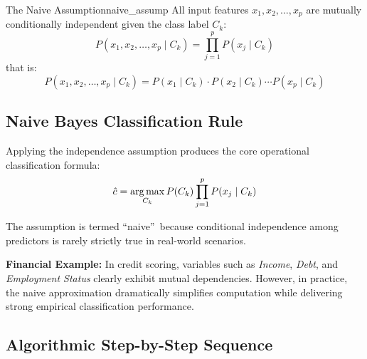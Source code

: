 \begin{definition}{The Naive Assumption}{naive_assump}
All input features $x_1, x_2, \dots, x_p$ are mutually conditionally independent given the class label $C_k$:
\begin{equation}
P(x_1, x_2, \dots, x_p \mid C_k) = \prod_{j=1}^p P(x_j \mid C_k)
\end{equation}
that is:
\begin{equation}
P(x_1, x_2, \dots, x_p \mid C_k) = P(x_1 \mid C_k) \cdot P(x_2 \mid C_k) \cdots P(x_p \mid C_k)
\end{equation}
\end{definition}

\subsection{Naive Bayes Classification Rule}
Applying the independence assumption produces the core operational classification formula:
\begin{equation}
\hat{c} = \operatorname*{arg\,max}_{C_k} P(C_k) \prod_{j=1}^p P(x_j \mid C_k)
\end{equation}

\begin{remarkbox}
The assumption is termed \textquotedblleft naive\textquotedblright\ because conditional independence among predictors is rarely strictly true in real-world scenarios.

\textbf{Financial Example:} In credit scoring, variables such as \textit{Income}, \textit{Debt}, and \textit{Employment Status} clearly exhibit mutual dependencies. However, in practice, the naive approximation dramatically simplifies computation while delivering strong empirical classification performance.
\end{remarkbox}

\subsection{Algorithmic Step-by-Step Sequence}

